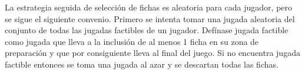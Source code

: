 \documentclass[a4paper,10pt,twocolumn]{article}
\begin{document}
	La estrategia seguida de selección de fichas es aleatoria para cada jugador, pero se sigue el siguiente convenio. Primero se intenta tomar una jugada aleatoria del conjunto de todas las jugadas factibles de un jugador. Defínase jugada factible como jugada que lleva a la inclusión de al menos 1 ficha en su zona de preparación y que por consiguiente lleva al final del juego. Si no encuentra jugada factible entonces se toma una jugada al azar y se descartan todas las fichas.
	


\label{end}
\end{document}
